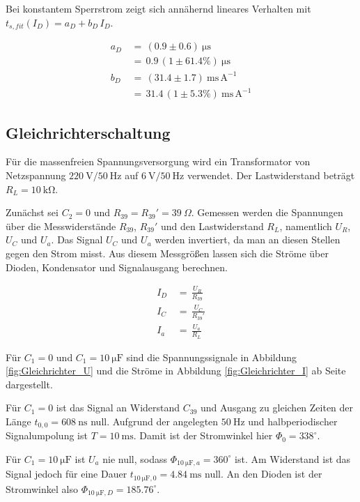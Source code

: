 \documentclass[10pt,a4paper]{scrartcl}
\begin{document}
Bei konstantem Sperrstrom zeigt sich annähernd lineares Verhalten mit
$t_{s,fit}(I_D)=a_D+b_D\,I_D$.

\begin{align}
    a_D \,&=\, \left(0.9\pm0.6\right)~\mathrm{\mu s}\\
          &=\, 0.9\,\left(1\pm61.4\%\right)~\mathrm{\mu s}\\
    b_D \,&=\, \left(31.4\pm1.7\right)~\mathrm{ms\,A^{-1}}\\
          &=\, 31.4\,\left(1\pm5.3\%\right)~\mathrm{ms\,A^{-1}}
\end{align}

\subsection {Gleichrichterschaltung}

Für die massenfreien Spannungsversorgung wird ein Transformator von Netzspannung
$220~\mathrm V/50~\mathrm{Hz}$ auf $6~\mathrm V/50~\mathrm{Hz}$ verwendet.
Der Lastwiderstand beträgt $R_L=10~\mathrm{k\Omega}$.

Zunächst sei $C_2=0$ und $R_{39}=R_{39}'=39~\Omega$.
Gemessen werden die Spannungen über die Messwiderstände $R_{39}$, $R_{39}'$
und den Lastwiderstand $R_L$,
namentlich $U_R$, $U_C$ und $U_a$.
Das Signal $U_C$ und $U_a$ werden invertiert,
da man an diesen Stellen gegen den Strom misst.
Aus diesem Messgrößen lassen sich die Ströme über Dioden, Kondensator und
Signalausgang berechnen.

\begin{align}
    I_D \,&=\,\frac{U_R}{R_{39}}\\
    I_C \,&=\,\frac{U_C}{R_{39}'}\\
    I_a \,&=\,\frac{U_a}{R_L}
\end{align}

Für $C_1=0$ und $C_1=10~\mathrm{\mu F}$ sind die Spannungssignale in Abbildung
\ref{fig:Gleichrichter_U} und die Ströme in Abbildung
\ref{fig:Gleichrichter_I} ab Seite \pageref{fig:Gleichrichter_U} dargestellt.

Für $C_1=0$ ist das Signal an Widerstand $C_{39}$ und Ausgang zu gleichen Zeiten
der Länge $t_{0,0}=608~\mathrm{ns}$ null.
Aufgrund der angelegten $50~\mathrm{Hz}$ und halbperiodischer Signalumpolung
ist $T=10~\mathrm{ms}$.
Damit ist der Stromwinkel hier $\Phi_0=338^\circ$.

Für $C_1=10~\mathrm{\mu F}$ ist $U_a$ nie null,
sodass $\Phi_{10~\mathrm{\mu F},a}=360^\circ$ ist.
Am Widerstand ist das Signal jedoch für eine Dauer
$t_{10~\mathrm{\mu F},0}=4.84~\mathrm{ms}$ null.
An den Dioden ist der Stromwinkel also
$\Phi_{10~\mathrm{\mu F},D}=185.76^\circ$.
\end{document}
